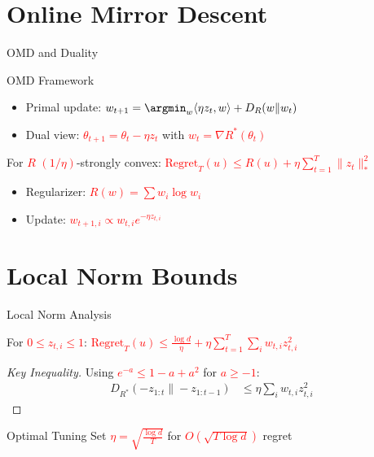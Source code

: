 \documentclass{beamer}
\newcommand{\mathred}[1]{\textcolor{red}{$#1$}} %
\begin{document}
\section{Online Mirror Descent}
\begin{frame}{OMD and Duality}
\begin{block}{OMD Framework}
\begin{itemize}
\item Primal update: \mathred{w_{t+1} = \argmin_w \langle \eta z_t, w \rangle + D_R(w\|w_t)}
\item Dual view: \mathred{\theta_{t+1} = \theta_t - \eta z_t} with \mathred{w_t = \nabla R^*(\theta_t)}
\end{itemize}
\end{block}

\begin{theorem}
For \mathred{R} \mathred{(1/\eta)}-strongly convex:
\mathred{\text{Regret}_T(u) \leq R(u) + \eta \sum_{t=1}^T \|z_t\|_*^2}
\end{theorem}

\begin{example}[EG Algorithm]
\begin{itemize}
\item Regularizer: \mathred{R(w) = \sum w_i\log w_i}
\item Update: \mathred{w_{t+1,i} \propto w_{t,i}e^{-\eta z_{t,i}}}
\end{itemize}
\end{example}
\end{frame}

\section{Local Norm Bounds}
\begin{frame}{Local Norm Analysis}
\begin{theorem}[Normalized EG]
For \mathred{0 \leq z_{t,i} \leq 1}:
\mathred{\text{Regret}_T(u) \leq \frac{\log d}{\eta} + \eta \sum_{t=1}^T \sum_i w_{t,i}z_{t,i}^2}
\end{theorem}

\begin{proof}[Key Inequality]
Using \mathred{e^{-a} \leq 1 - a + a^2} for \mathred{a \geq -1}:
\begin{align*}
D_{R^*}(-z_{1:t}\|-z_{1:t-1}) &\leq \eta \sum_i w_{t,i}z_{t,i}^2
\end{align*}
\end{proof}

\begin{block}{Optimal Tuning}
Set \mathred{\eta = \sqrt{\frac{\log d}{T}}} for \mathred{O(\sqrt{T\log d})} regret
\end{block}
\end{frame}
\end{document}
